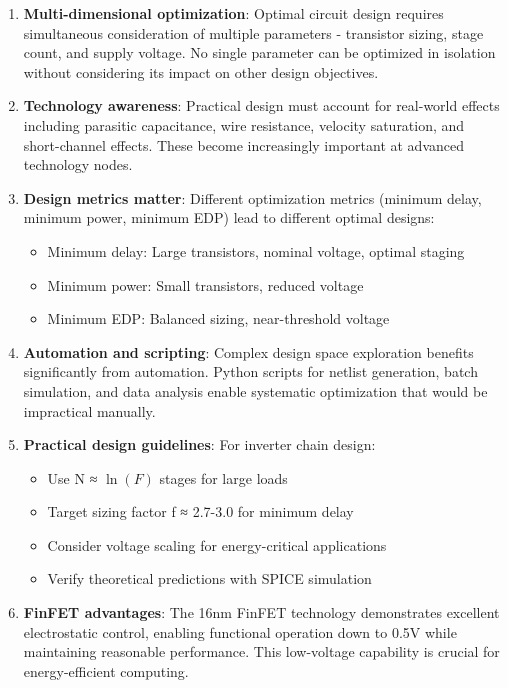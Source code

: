 \documentclass[UTF8,12pt,a4paper]{ctexart}
\begin{document}
\begin{enumerate}
    \item \textbf{Multi-dimensional optimization}: Optimal circuit design requires simultaneous consideration of multiple parameters - transistor sizing, stage count, and supply voltage. No single parameter can be optimized in isolation without considering its impact on other design objectives.
    
    \item \textbf{Technology awareness}: Practical design must account for real-world effects including parasitic capacitance, wire resistance, velocity saturation, and short-channel effects. These become increasingly important at advanced technology nodes.
    
    \item \textbf{Design metrics matter}: Different optimization metrics (minimum delay, minimum power, minimum EDP) lead to different optimal designs:
    \begin{itemize}
        \item Minimum delay: Large transistors, nominal voltage, optimal staging
        \item Minimum power: Small transistors, reduced voltage
        \item Minimum EDP: Balanced sizing, near-threshold voltage
    \end{itemize}
    
    \item \textbf{Automation and scripting}: Complex design space exploration benefits significantly from automation. Python scripts for netlist generation, batch simulation, and data analysis enable systematic optimization that would be impractical manually.
    
    \item \textbf{Practical design guidelines}: For inverter chain design:
    \begin{itemize}
        \item Use N ≈ $\ln(F)$ stages for large loads
        \item Target sizing factor f ≈ 2.7-3.0 for minimum delay
        \item Consider voltage scaling for energy-critical applications
        \item Verify theoretical predictions with SPICE simulation
    \end{itemize}
    
    \item \textbf{FinFET advantages}: The 16nm FinFET technology demonstrates excellent electrostatic control, enabling functional operation down to 0.5V while maintaining reasonable performance. This low-voltage capability is crucial for energy-efficient computing.
\end{enumerate}
\end{document}
